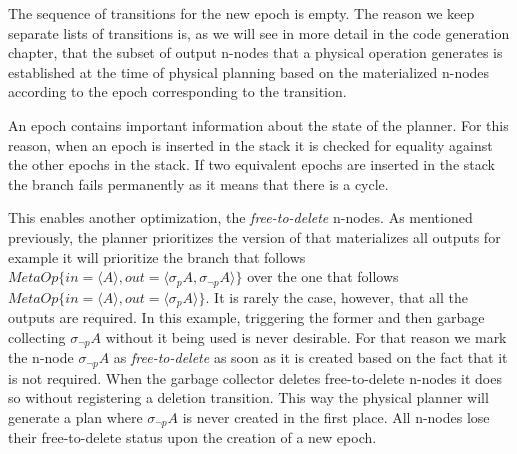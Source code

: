 The sequence of transitions for the new epoch is empty. The reason we
keep separate lists of transitions is, as we will see in more detail
in the code generation chapter, that the subset of output n-nodes that a
physical operation generates is established at the time of physical
planning based on the materialized n-nodes according to the epoch
corresponding to the transition.

An epoch contains important information about the state of the
planner. For this reason, when an epoch is inserted in the stack it is
checked for equality against the other epochs in the stack. If two
equivalent epochs are inserted in the stack the branch fails
permanently as it means that there is a cycle.

This enables another optimization, the \emph{free-to-delete} n-nodes. As
mentioned previously, the planner prioritizes the version of
 that materializes all outputs for example it will
prioritize the branch that follows
\(MetaOp\{in=\langle A \rangle, out=\langle \sigma_p A, \sigma_{\neg
  p} A \rangle \}\) over the one that follows
\(MetaOp\{in=\langle A \rangle, out=\langle \sigma_p A \rangle
\}\). It is rarely the case, however, that all the outputs are
required. In this example,
triggering the former  and then garbage collecting
\(\sigma_{\neg p} A\) without it being used is never desirable. For
that reason we mark the n-node \(\sigma_{\neg p} A\) as
\emph{free-to-delete} as soon as it is created based on the fact that
it is not required. When the garbage collector deletes free-to-delete
n-nodes it does so without registering a deletion transition. This way
the physical planner will generate a plan where \(\sigma_{\neg p} A\)
is never created in the first place. All n-nodes lose their
free-to-delete status upon the creation of a new epoch.

